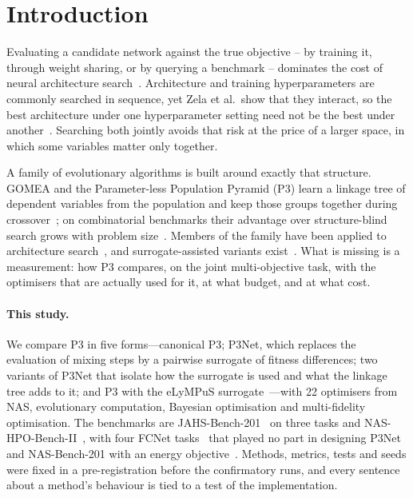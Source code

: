\section{Introduction}
\label{sec:introduction}

Evaluating a candidate network against the true objective -- by training it, through weight sharing, or by
querying a benchmark -- dominates the cost of neural architecture search~\citep{white2023insights,liu2023survey}.
Architecture and training hyperparameters are commonly searched in sequence, yet Zela et al.\ show that they
interact, so the best architecture under one hyperparameter setting need not be the best under
another~\citep{zela2018towards}. Searching both jointly avoids that risk at the price of a larger space, in which
some variables matter only together.

A family of evolutionary algorithms is built around exactly that structure. GOMEA and the Parameter-less Population
Pyramid (P3) learn a linkage tree of dependent variables from the population and keep those groups together during
crossover~\citep{thierens2011optimal,goldman2014parameterless}; on combinatorial benchmarks their advantage over
structure-blind search grows with problem size~\citep{goldman2015fast,qiao2024gomearuntime}. Members of the family
have been applied to architecture search~\citep{denottelander2021localsearch,chebykin2022encas,dahi2026tightening},
and surrogate-assisted variants exist~\citep{dushatskiy2021novelsurrogateassistedevolutionaryalgorithm,przewozniczek2026lympus}.
What is missing is a measurement: how P3 compares, on the joint multi-objective task, with the optimisers that are
actually used for it, at what budget, and at what cost.

\paragraph{This study.} We compare P3 in five forms---canonical P3; P3Net, which replaces the evaluation of mixing steps
by a pairwise surrogate of fitness differences; two variants of P3Net that isolate how the surrogate is used and what
the linkage tree adds to it; and P3 with the eLyMPuS surrogate~\citep{przewozniczek2026lympus}---with 22 optimisers
from NAS, evolutionary computation, Bayesian optimisation and multi-fidelity optimisation. The benchmarks are
JAHS-Bench-201~\citep{bansal2022jahsbench} on three tasks and NAS-HPO-Bench-II~\citep{hirose2021nashpobenchii}, with
four FCNet tasks~\citep{klein2019tabular} that played no part in designing P3Net and NAS-Bench-201 with an energy
objective~\citep{dong2020nasbench201,li2021hwnasbench}. Methods, metrics, tests and seeds were fixed in a
pre-registration before the confirmatory runs, and every sentence about a method's behaviour is tied to a test of the
implementation.

